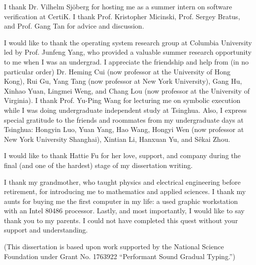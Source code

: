 I thank Dr. Vilhelm Sj\"{o}berg for hosting me as a summer intern on software
verification at CertiK. I thank Prof. Kristopher Micinski, Prof. Sergey Bratus,
and Prof. Gang Tan for advice and discussion.

I would like to thank the operating system research group at Columbia University
led by Prof. Junfeng Yang, who provided a valuable summer research opportunity
to me when I was an undergrad. I appreciate the friendship and help from (in no
particular order) Dr. Heming Cui (now professor at the University of Hong Kong),
Rui Gu, Yang Tang (now professor at New York University), Gang Hu, Xinhao Yuan,
Lingmei Weng, and Chang Lou (now professor at the University of Virginia). I
thank Prof. Yu-Ping Wang for lecturing me on symbolic execution while I was
doing undergraduate independent study at Tsinghua. Also, I express special
gratitude to the friends and roommates from my undergraduate days at Tsinghua:
Hongyin Luo, Yuan Yang, Hao Wang, Hongyi Wen (now professor at New York
University Shanghai), Xintian Li, Hanxuan Yu, and S\^{e}kai Zhou.

I would like to thank Hattie Fu for her love, support, and company during the
final (and one of the hardest) stage of my dissertation writing.

I thank my grandmother, who taught physics and electrical engineering before
retirement, for introducing me to mathematics and applied sciences. I thank my
aunts for buying me the first computer in my life: a used graphic workstation
with an Intel 80486 processor. Lastly, and most importantly, I would like to say
thank you to my parents. I could not have completed this quest without your
support and understanding.

(This dissertation is based upon work supported by the National Science
Foundation under Grant No. 1763922 ``Performant Sound Gradual Typing.'')
